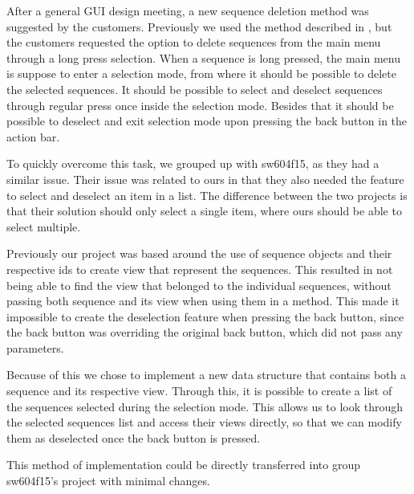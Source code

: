 After a general GUI design meeting, a new sequence deletion method was suggested by the customers. Previously we used the method described in , but the customers requested the option to delete sequences from the main menu through a long press selection. When a sequence is long pressed, the main menu is suppose to enter a selection mode, from where it should be possible to delete the selected sequences. It should be possible to select and deselect sequences through regular press once inside the selection mode. Besides that it should be possible to deselect and exit selection mode upon pressing the back button in the action bar.
 
To quickly overcome this task, we grouped up with sw604f15, as they had a similar issue. Their issue was related to ours in that they also needed the feature to select and deselect an item in a list. The difference between the two projects is that their solution should only select a single item, where ours should be able to select multiple.
 
Previously our project was based around the use of sequence objects and their respective ids to create view that represent the sequences. This resulted in not being able to find the view that belonged to the individual sequences, without passing both sequence and its view when using them in a method. This made it impossible to create the deselection feature when pressing the back button, since the back button was overriding the original back button, which did not pass any parameters.
 
Because of this we chose to implement a new data structure that contains both a sequence and its respective view. Through this, it is possible to create a list of the sequences selected during the selection mode. This allows us to look through the selected sequences list and access their views directly, so that we can modify them as deselected once the back button is pressed.
 
This method of implementation could be directly transferred into group sw604f15's project with minimal changes.